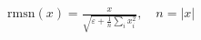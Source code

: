 \documentclass{article}
\begin{document}
\begin{preview}
$\displaystyle \mathrm{rmsn}(x) = \frac{x}{\sqrt{\varepsilon + \frac{1}{n}\sum_i x_i^2}},\quad n = |x|$
\end{preview}
\end{document}
